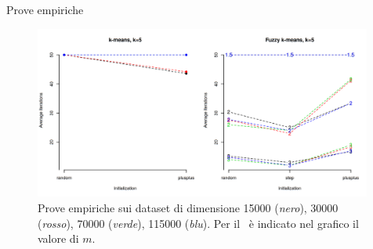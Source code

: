 \documentclass{beamer}
\begin{document}
\begin{frame}{Prove empiriche}
    \begin{figure}[H]
        \centering
        \includegraphics[width=0.99\textwidth]{figures/clust-5.png}
        \caption{Prove empiriche sui dataset di dimensione 15000 (\textit{nero}), 30000 (\textit{rosso}), 70000 (\textit{verde}), 115000 (\textit{blu}). Per il \fcm\ è indicato nel grafico il valore di $m$.}
        \label{fig:k5}
    \end{figure}
\end{frame}
% 
% 
\end{document}

